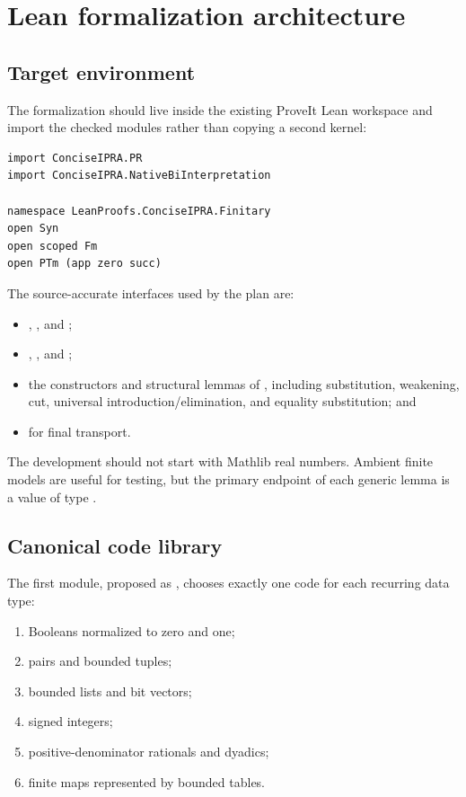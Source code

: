 \section{Lean formalization architecture}
\label{sec:lean-plan}

\subsection{Target environment}

The formalization should live inside the existing ProveIt Lean workspace and
import the checked modules rather than copying a second kernel:

\begin{lstlisting}[style=lean]
import ConciseIPRA.PR
import ConciseIPRA.NativeBiInterpretation

namespace LeanProofs.ConciseIPRA.Finitary
open Syn
open scoped Fm
open PTm (app zero succ)
\end{lstlisting}

The source-accurate interfaces used by the plan are:

\begin{itemize}
\item {}, , and ;
\item {}, , and ;
\item the constructors and structural lemmas of , including
      substitution, weakening, cut, universal introduction/elimination, and
      equality substitution; and
\item {} for final transport.
\end{itemize}

The development should not start with Mathlib real numbers.  Ambient finite
models are useful for testing, but the primary endpoint of each generic lemma
is a value of type .

\subsection{Canonical code library}

The first module, proposed as , chooses exactly one
code for each recurring data type:

\begin{enumerate}
\item Booleans normalized to zero and one;
\item pairs and bounded tuples;
\item bounded lists and bit vectors;
\item signed integers;
\item positive-denominator rationals and dyadics;
\item finite maps represented by bounded tables.
\end{enumerate}

